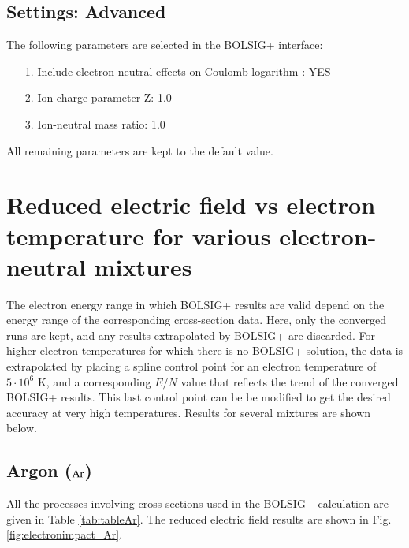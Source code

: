 \subsection{Settings: Advanced}

The following parameters are selected in the BOLSIG+ interface:

\begin{itemize}
\item[1.]{Include electron-neutral effects on Coulomb logarithm : YES}
\item[2.]{Ion charge parameter Z: 1.0}
\item[3.]{Ion-neutral mass ratio: 1.0}
\end{itemize}
All remaining parameters are kept to the default value.

\section{Reduced electric field vs electron temperature for various electron-neutral mixtures}

The electron energy range in which BOLSIG+ results are valid depend on the energy range of the corresponding cross-section data. Here, only the converged runs are kept, and any results extrapolated by BOLSIG+ are discarded. For higher electron temperatures for which there is no BOLSIG+ solution, the data is extrapolated by placing a spline control point for an electron temperature of $5\cdot10^6$ K, and a corresponding $E/N$ value that reflects the trend of the converged BOLSIG+ results. This last control point can be be modified to get the desired accuracy at very high temperatures. Results for several mixtures are shown below.

%

\subsection{Argon ($\rm Ar$)}

All the processes involving cross-sections used in the BOLSIG+ calculation are given in Table \ref{tab:tableAr}. The reduced electric field results are shown in Fig. \ref{fig:electronimpact_Ar}.

